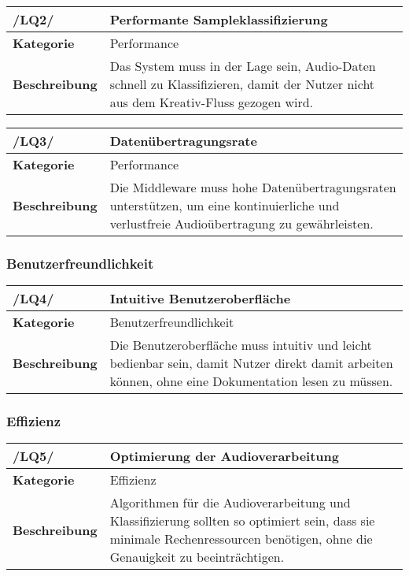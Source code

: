 \begin{table}[h!]
	\begin{tabularx}{\textwidth}{|l|X|}
		\hline
		\textbf{/LQ2/} & \textbf{Performante Sampleklassifizierung} \\ \hline
		\textbf{Kategorie} & Performance \\ \hline
		\textbf{Beschreibung} & Das System muss in der Lage sein, Audio-Daten schnell zu Klassifizieren, damit der Nutzer nicht aus dem Kreativ-Fluss gezogen wird. \\ \hline
	\end{tabularx}
\end{table}

\begin{table}[h!]
	\begin{tabularx}{\textwidth}{|l|X|}
		\hline
		\textbf{/LQ3/} & \textbf{Datenübertragungsrate} \\ \hline
		\textbf{Kategorie} & Performance \\ \hline
		\textbf{Beschreibung} & Die Middleware muss hohe Datenübertragungsraten unterstützen, um eine kontinuierliche und verlustfreie Audioübertragung zu gewährleisten. \\ \hline
	\end{tabularx}
\end{table}

\subsubsection{Benutzerfreundlichkeit}

\begin{table}[h!]
	\begin{tabularx}{\textwidth}{|l|X|}
		\hline
		\textbf{/LQ4/} & \textbf{Intuitive Benutzeroberfläche} \\ \hline
		\textbf{Kategorie} & Benutzerfreundlichkeit \\ \hline
		\textbf{Beschreibung} & Die Benutzeroberfläche muss intuitiv und leicht bedienbar sein, damit Nutzer direkt damit arbeiten können, ohne eine Dokumentation lesen zu müssen. \\ \hline
	\end{tabularx}
\end{table}

\newpage
\subsubsection{Effizienz}

\begin{table}[h!]
	\begin{tabularx}{\textwidth}{|l|X|}
		\hline
		\textbf{/LQ5/} & \textbf{Optimierung der Audioverarbeitung} \\ \hline
		\textbf{Kategorie} & Effizienz \\ \hline
		\textbf{Beschreibung} & Algorithmen für die Audioverarbeitung und Klassifizierung sollten so optimiert sein, dass sie minimale Rechenressourcen benötigen, ohne die Genauigkeit zu beeinträchtigen. \\ \hline
	\end{tabularx}
\end{table}